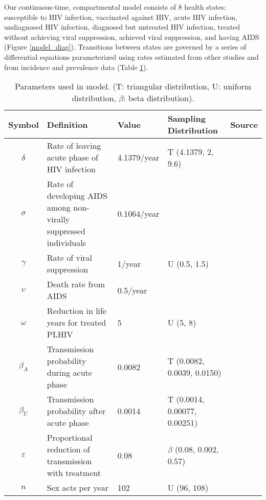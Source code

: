 \documentclass[11pt]{article}
\begin{document}
Our continuous-time, compartmental model consists of 8 health states:
susceptible to HIV infection, vaccinated against HIV, acute HIV
infection, undiagnosed HIV infection, diagnosed but untreated HIV
infection, treated without achieving viral suppression, achieved viral
suppression, and having AIDS (Figure \ref{model_diag}). Transitions
between states are governed by a series of differential equations
parameterized using rates estimated from other studies and from
incidence and prevalence data (Table \ref{model_param}).


\begin{table}
\begin{center}
  \begin{tabular}{cp{4cm}llc}
\hline
    Symbol & Definition & Value & Sampling Distribution & Source \\ \hline
    $\delta$	& Rate of leaving acute phase of HIV infection & 4.1379/year & T (4.1379, 2, 9.6) & \cite{Hollingsworth2008-iy} \\
    $\sigma$	& Rate of developing AIDS among non-virally suppressed individuals
                       & 0.1064/year & & \cite{Morgan2002-cq} \\
    $\gamma$ & Rate of viral suppression & 1/year & U (0.5, 1.5) & \cite{Currie2009-yz} \\
    $\upsilon$	& Death rate from AIDS & 0.5/year &  & \cite{Morgan2002-cq} \\
    $\omega$	& Reduction in life years for treated PLHIV & 5 & U (5, 8) & \cite{Unaids2014-ue, Samji2013-kf}\\
    $\beta_{A}$	& Transmission probability during acute phase & 0.0082 & T (0.0082, 0.0039, 0.0150) & \cite{Skarbinski2015-ni,Wawer2005-us}\\
    $\beta_{U}$	& Transmission probability after acute phase & 0.0014 & T (0.0014, 0.00077, 0.00251) & \cite{Hughes2012-so}\\
    $\varepsilon$	& Proportional reduction of transmission with treatment & 0.08 & $\beta$ (0.08, 0.002, 0.57)& \cite{Donnell2010-xo}\\
    $n$			& Sex acts per year & 102 & U (96, 108) & \cite{Wawer2005-us,Abdool_Karim2010-cm}\\ \hline
  \end{tabular}
\caption{Parameters used in model. (T: triangular distribution, U:
  uniform distribution, $\beta$: beta distribution).}
\end{center}
\label{model_param}
\end{table}
\end{document}
